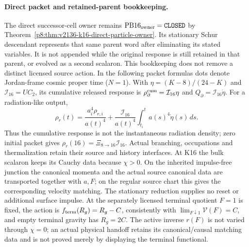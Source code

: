 \documentclass[12pt,a4paper]{article}
\begin{document}
\paragraph{Direct packet and retained-parent bookkeeping.}
The direct successor-cell owner remains
$\mathrm{PB16}_{\rm owner}=\texttt{CLOSED}$ by
Theorem~\ref{p8:thm:v2136-k16-direct-particle-owner}. Its stationary Schur
descendant represents that same parent word after eliminating its stated
variables. It is not appended while the original response is still retained
in that parent, or evolved as a second scalaron. This bookkeeping does not
remove a distinct licensed source action. In the following packet formulas
dots denote Jordan-frame cosmic proper time ($N=1$). With
$\eta=(K-8)/(24-K)$ and $\mathcal I_{16}=UC_2$, its cumulative released
response is $\rho_\partial^{\rm cum}=\mathcal I_{16}\eta$ and
$Q_\partial=\mathcal I_{16}\dot\eta$. For a radiation-like output,
\begin{equation}
 \rho_r(t)=\frac{a_i^4\rho_{r,i}}{a(t)^4}
 +\frac{\mathcal I_{16}}{a(t)^4}
 \int_{t_i}^t a(s)^4\dot\eta(s)\,ds.
 \label{p8:eq:v2171-direct-packet-dilution}
\end{equation}
Thus the cumulative response is not the instantaneous radiation density;
zero initial packet gives $\rho_r(16)=\Xi_{8\to16}\mathcal I_{16}$.
Actual branching, occupations and thermalization retain their source and
history interfaces. At K16 the bulk scalaron keeps its Cauchy data because
$\chi>0$. On the inherited impulse-free junction the canonical momenta and
the actual source canonical data are transported together with $a,F$;
on the regular source chart this gives the corresponding velocity matching.
The stationary reduction supplies no reset or additional surface impulse.
At the separately licensed terminal quotient $F=1$ is fixed, the action is
$f_{\rm term}(R_g)=R_g-C$, consistently with
$\lim_{F\downarrow1}\mathcal V(F)=C$, and empty terminal gravity has
$R_g=2C$.
The active inverse $r(F)$ is not varied through $\chi=0$; an actual physical
handoff retains its canonical/causal matching data and is not proved merely
by displaying the terminal functional.
\end{document}
